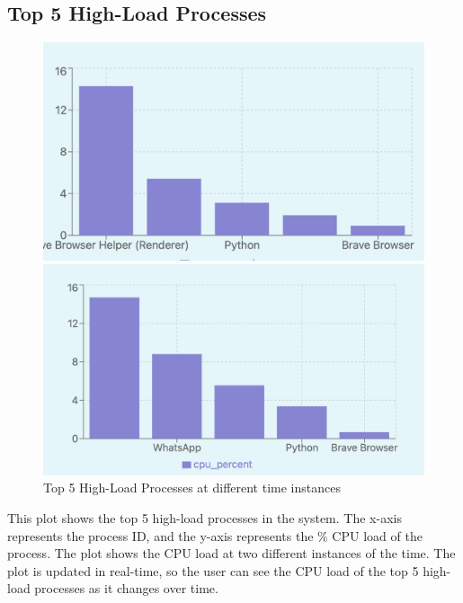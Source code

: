 \documentclass[12pt]{article}
\begin{document}
\subsection{Top 5 High-Load Processes}
\begin{figure}[H]
    \centering
    \begin{minipage}{0.45\textwidth}
        \centering
        \includegraphics[width=\textwidth]{logos and images/top5_1.png}
    \end{minipage}
    \hfill
    \begin{minipage}{0.45\textwidth}
        \centering
        \includegraphics[width=\textwidth]{logos and images/top5_2.png}
    \end{minipage}
    \caption{Top 5 High-Load Processes at different time instances}
\end{figure}
This plot shows the top 5 high-load processes in the system. The x-axis represents the process ID, and the y-axis represents the \% CPU load of the process. The plot shows the CPU load at two different instances of the time. The plot is updated in real-time, so the user can see the CPU load of the top 5 high-load processes as it changes over time.
\end{document}
